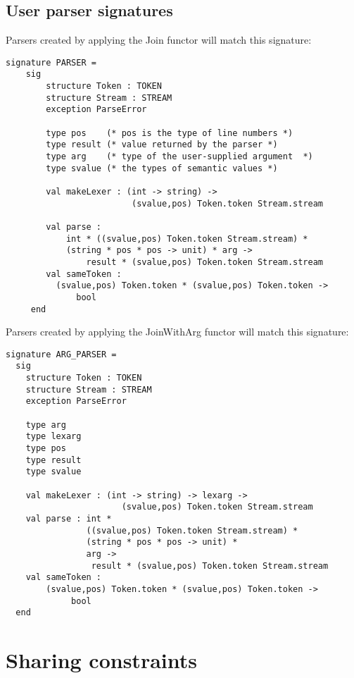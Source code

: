 \documentclass{article}
\begin{document}
\subsection{User parser signatures}

Parsers created by applying the Join functor will match this signature:
\begin{tt}
\begin{verbatim}
signature PARSER =
    sig
        structure Token : TOKEN
        structure Stream : STREAM
        exception ParseError

        type pos    (* pos is the type of line numbers *)
        type result (* value returned by the parser *)
        type arg    (* type of the user-supplied argument  *)
        type svalue (* the types of semantic values *)

        val makeLexer : (int -> string) ->
                         (svalue,pos) Token.token Stream.stream

        val parse :
            int * ((svalue,pos) Token.token Stream.stream) *
            (string * pos * pos -> unit) * arg ->
                result * (svalue,pos) Token.token Stream.stream
        val sameToken :
          (svalue,pos) Token.token * (svalue,pos) Token.token ->
              bool
     end
\end{verbatim}
\end{tt}
Parsers created by applying the JoinWithArg functor will match this
signature:
\begin{tt}
\begin{verbatim}
signature ARG_PARSER = 
  sig
    structure Token : TOKEN
    structure Stream : STREAM
    exception ParseError

    type arg
    type lexarg
    type pos
    type result
    type svalue

    val makeLexer : (int -> string) -> lexarg ->
                       (svalue,pos) Token.token Stream.stream
    val parse : int *
                ((svalue,pos) Token.token Stream.stream) *
                (string * pos * pos -> unit) *
                arg ->
                 result * (svalue,pos) Token.token Stream.stream
    val sameToken :
        (svalue,pos) Token.token * (svalue,pos) Token.token ->
             bool
  end
\end{verbatim}
\end{tt}

\section{Sharing constraints}
\end{document}
